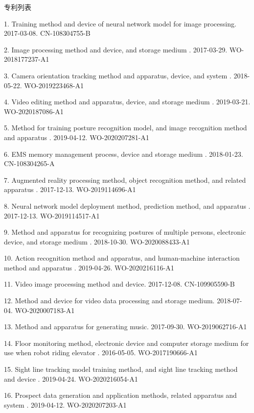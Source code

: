 \documentclass[UTF8]{cv_professional-cn} %
\makeatletter
\newlength{\bibhang}
\newlength{\bibsep}
 {\@listi \global\bibsep\itemsep \global\advance\bibsep by\parsep}
\newenvironment{bibsection}%
        {\vspace{\itemsep}\begin{list}{}{%
       \setlength{\leftmargin}{\bibhang}%
       \setlength{\itemsep}{\bibsep}%
       \setlength{\parsep}{\z@}%
        \setlength{\partopsep}{0pt}%
        \setlength{\topsep}{0pt}}}
        {\end{list}\vspace{\itemsep}}
\makeatother
\begin{document}
\begin{rSection}{专利列表}

\begin{bibsection}
        \item[1.] Training method and device of neural network model for image processing. 2017-03-08. CN-108304755-B
        \item[2.] Image processing method and device, and storage medium . 2017-03-29. WO-2018177237-A1
        \item[3.] Camera orientation tracking method and apparatus, device, and system . 2018-05-22. WO-2019223468-A1
        \item[4.] Video editing method and apparatus, device, and storage medium . 2019-03-21. WO-2020187086-A1
        \item[5.] Method for training posture recognition model, and image recognition method and apparatus . 2019-04-12. WO-2020207281-A1
        \item[6.] EMS memory management process, device and storage medium . 2018-01-23. CN-108304265-A
        \item[7.] Augmented reality processing method, object recognition method, and related apparatus . 2017-12-13. WO-2019114696-A1
        \item[8.] Neural network model deployment method, prediction method, and apparatus . 2017-12-13. WO-2019114517-A1
        \item[9.] Method and apparatus for recognizing postures of multiple persons, electronic device, and storage medium . 2018-10-30. WO-2020088433-A1
        \item[10.] Action recognition method and apparatus, and human-machine interaction method and apparatus . 2019-04-26. WO-2020216116-A1
        \item[11.] Video image processing method and device. 2017-12-08. CN-109905590-B
        \item[12.] Method and device for video data processing and storage medium. 2018-07-04. WO-2020007183-A1
        \item[13.] Method and apparatus for generating music. 2017-09-30. WO-2019062716-A1
        \item[14.] Floor monitoring method, electronic device and computer storage medium for use when robot riding elevator . 2016-05-05. WO-2017190666-A1
        \item[15.] Sight line tracking model training method, and sight line tracking method and device . 2019-04-24. WO-2020216054-A1
        \item[16.] Prospect data generation and application methods, related apparatus and system . 2019-04-12. WO-2020207203-A1

\end{bibsection}
\end{rSection}
\end{document}
